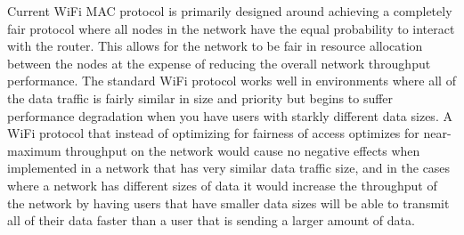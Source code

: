 \documentclass{sigcomm-alternate}
\begin{document}



%
%



Current WiFi MAC protocol is primarily designed around achieving a completely fair protocol where all nodes in the network have the equal probability to interact with the router. This allows for the network to be fair in resource allocation between the nodes at the expense of reducing the overall network throughput performance. The standard WiFi protocol works well in environments where all of the data traffic is fairly similar in size and priority but begins to suffer performance degradation when you have users with starkly different data sizes. A WiFi protocol that instead of optimizing for fairness of access optimizes for near-maximum throughput on the network would cause no negative effects when implemented in a network that has very similar data traffic size, and in the cases where a network has different sizes of data it would increase the throughput of the network by having users that have smaller data sizes will be able to transmit all of their data faster than a user that is sending a larger amount of data. 
\end{document}
